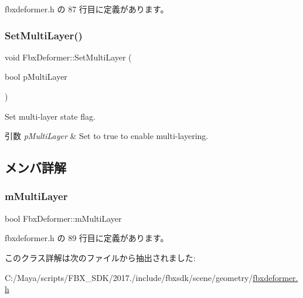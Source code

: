  fbxdeformer.\+h の 87 行目に定義があります。

\mbox{\label{class_fbx_deformer_ac1152e69487365faa19fe23ffde19f85}} 
\subsubsection{\texorpdfstring{Set\+Multi\+Layer()}{SetMultiLayer()}}
{\footnotesize\ttfamily void Fbx\+Deformer\+::\+Set\+Multi\+Layer (\begin{DoxyParamCaption}\item[{bool}]{p\+Multi\+Layer }\end{DoxyParamCaption})}

Set multi-\/layer state flag. 
\begin{DoxyParams}{引数}
{\em p\+Multi\+Layer} & Set to {\ttfamily true} to enable multi-\/layering. \\
\hline
\end{DoxyParams}


\subsection{メンバ詳解}
\mbox{\label{class_fbx_deformer_ac570aba2e0282a6075831422a05c2d48}} 
\subsubsection{\texorpdfstring{m\+Multi\+Layer}{mMultiLayer}}
{\footnotesize\ttfamily bool Fbx\+Deformer\+::m\+Multi\+Layer\hspace{0.3cm}{\ttfamily [protected]}}



 fbxdeformer.\+h の 89 行目に定義があります。



このクラス詳解は次のファイルから抽出されました\+:\begin{DoxyCompactItemize}
\item 
C\+:/\+Maya/scripts/\+F\+B\+X\+\_\+\+S\+D\+K/2017./include/fbxsdk/scene/geometry/\hyperlink{fbxdeformer_8h}{fbxdeformer.\+h}\end{DoxyCompactItemize}
